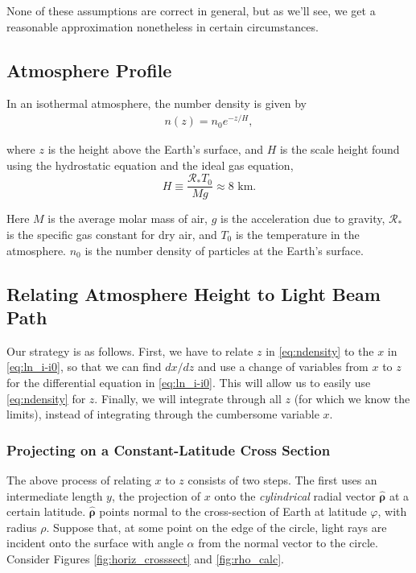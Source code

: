 \documentclass[10pt]{article}
\begin{document}
None of these assumptions are correct in general, but as we'll see, we get a reasonable approximation nonetheless in certain circumstances.

\subsection{Atmosphere Profile}
In an isothermal atmosphere, the number density is given by 
\begin{align} \label{eq:ndensity}
n(z) = n_0 e^{-z/H},
\end{align}

where $z$ is the height above the Earth's surface, and $H$ is the scale height found using the hydrostatic equation and the ideal gas equation,
$$
H \equiv \frac{\mathcal{R}_* T_0}{Mg} \approx 8 \text{ km}.
$$

Here $M$ is the average molar mass of air, $g$ is the acceleration due to gravity, $\mathcal{R}_*$ is the specific gas constant for dry air, and $T_0$ is the temperature in the atmosphere. $n_0$ is the number density of particles at the Earth's surface.

\subsection{Relating Atmosphere Height to Light Beam Path}

Our strategy is as follows. First, we have to relate $z$ in \eqref{eq:ndensity} to the $x$ in \eqref{eq:ln_i-i0}, so that we can find $dx/dz$ and use a change of variables from $x$ to $z$ for the differential equation in \eqref{eq:ln_i-i0}. This will allow us to easily use \eqref{eq:ndensity} for $z$. Finally, we will integrate through all $z$ (for which we know the limits), instead of integrating through the cumbersome variable $x$. 

\subsubsection{Projecting on a Constant-Latitude Cross Section}
\label{subsubsec:constlat}
The above process of relating $x$ to $z$ consists of two steps. The first uses an intermediate length $y$, the projection of $x$ onto the \emph{cylindrical} radial vector $\mathbf{\hat{\rho}}$ at a certain latitude. $\mathbf{\hat{\rho}}$ points normal to the cross-section of Earth at latitude $\varphi$, with radius $\rho$. Suppose that, at some point on the edge of the circle, light rays are incident onto the surface with angle $\alpha$ from the normal vector to the circle. Consider Figures \ref{fig:horiz_crosssect} and \ref{fig:rho_calc}.
\end{document}
